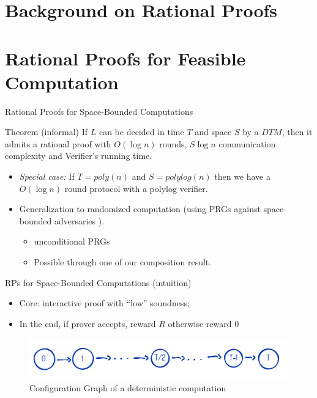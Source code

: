 \section{Background on Rational Proofs}


\section{Rational Proofs for Feasible Computation}

\begin{frame}{Rational Proofs for Space-Bounded Computations}
\begin{block}{Theorem (informal)}
	If $L$ can be decided in time $T$ and space $S$ by a $DTM$, then it admits a rational proof with $O(\log n)$ rounds, $S \log n$ communication complexity and Verifier's running time.
\end{block}
\pause
\begin{itemize}[<+->]
	\item \textit{Special case:} If $T=poly(n)$ and $S=polylog(n)$ then we have a $O(\log n)$ round protocol with a polylog verifier.
	\item Generalization to randomized computation (using PRGs against space-bounded adversaries \cite{nisan1992pseudorandom}).
	\begin{itemize}
		\item unconditional PRGs
		\item Possible through one of our composition result.
	\end{itemize}
\end{itemize}
\end{frame}

\begin{frame}{RPs for Space-Bounded Computations (intuition)}
\begin{itemize}
	\item Core: interactive proof with ``low'' soundness;\pause
	\item In the end, if prover accepts, reward $R$ otherwise reward $0$
\end{itemize}
\medskip
\begin{figure}
	\includegraphics[scale=0.3]{pics/space-protocol.png}
	\caption{Configuration Graph of a deterministic computation}
\end{figure}
\end{frame}

